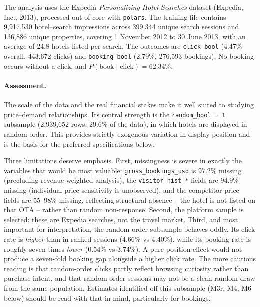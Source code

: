 \documentclass[11pt]{article}
\newcommand{\code}[1]{\texttt{\small #1}}
\begin{document}
The analysis uses the Expedia \emph{Personalizing Hotel Searches} dataset
(Expedia, Inc., 2013), processed out-of-core with \code{polars}. The training
file contains 9,917,530 hotel--search impressions across 399,344 unique search
sessions and 136,886 unique properties, covering 1 November 2012 to 30 June
2013, with an average of 24.8 hotels listed per search. The outcomes are
\code{click\_bool} (4.47\% overall, 443,672 clicks) and \code{booking\_bool}
(2.79\%, 276,593 bookings). No booking occurs without a click, and
$P(\text{book} \mid \text{click}) = 62.34\%$.

\paragraph{Assessment.} The scale of the data and the real financial stakes
make it well suited to studying price--demand relationships. Its central
strength is the \code{random\_bool = 1} subsample (2,939,652 rows, 29.6\% of
the data), in which hotels are displayed in random order. This provides
strictly exogenous variation in display position and is the basis for the
preferred specifications below.

Three limitations deserve emphasis. First, missingness is severe in exactly
the variables that would be most valuable: \code{gross\_bookings\_usd} is
97.2\% missing (precluding revenue-weighted analysis), the
\code{visitor\_hist\_*} fields are 94.9\% missing (individual price
sensitivity is unobserved), and the competitor price fields are 55--98\%
missing, reflecting structural absence -- the hotel is not listed on that OTA
-- rather than random non-response. Second, the platform sample is selected:
these are Expedia searches, not the travel market. Third, and most important
for interpretation, the random-order subsample behaves oddly. Its click rate
is \emph{higher} than in ranked sessions (4.66\% vs 4.40\%), while its booking
rate is roughly seven times \emph{lower} (0.54\% vs 3.74\%). A pure position
effect would not produce a seven-fold booking gap alongside a higher click
rate. The more cautious reading is that random-order clicks partly reflect
browsing curiosity rather than purchase intent, and that random-order sessions
may not be a clean random draw from the same population. Estimates identified
off this subsample (M3r, M4, M6 below) should be read with that in mind,
particularly for bookings.
\end{document}

